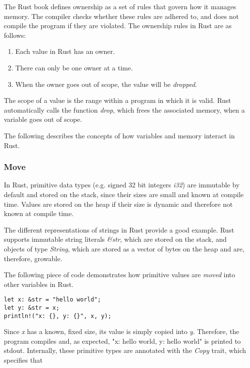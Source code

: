 \documentclass[sigplan,11pt,nonacm]{acmart}
\begin{document}
The Rust book \cite{rust-book} defines ownership as a set of rules that govern how it manages memory.
The compiler checks whether these rules are adhered to, and does not compile the program if they are violated.
The ownership rules in Rust are as follows:
\begin{enumerate}
  \item Each value in Rust has an owner.
  \item There can only be one owner at a time.
  \item When the owner goes out of scope, the value will be \emph{dropped}.
\end{enumerate}
The scope of a value is the range within a program in which it is valid.
Rust automatically calls the function \emph{drop}, which frees the associated memory, when a variable goes out of scope.

The following describes the concepts of how variables and memory interact in Rust.
\cite{rust-book}

\subsubsection{Move}

In Rust, primitive data types (e.g. signed 32 bit integers \emph{i32}) are immutable by default and stored on the stack, since their sizes are small and known at compile time.
Values are stored on the heap if their size is dynamic and therefore not known at compile time.

The different representations of strings in Rust provide a good example.
Rust supports immutable string literals \emph{\&str}, which are stored on the stack, and objects of type \emph{String}, which are stored as a vector of bytes on the heap and are, therefore, growable. \cite{rust-by-example}

The following piece of code demonstrates how primitive values are \emph{moved} into other variables in Rust.
\begin{lstlisting}
let x: &str = "hello world";
let y: &str = x;
println!("x: {}, y: {}", x, y);
\end{lstlisting}
Since \emph{x} has a known, fixed size, its value is simply copied into \emph{y}.
Therefore, the program compiles and, as expected, "x: hello world, y: hello world" is printed to stdout.
Internally, these primitive types are annotated with the \emph{Copy} trait, which specifies that 
\end{document}
